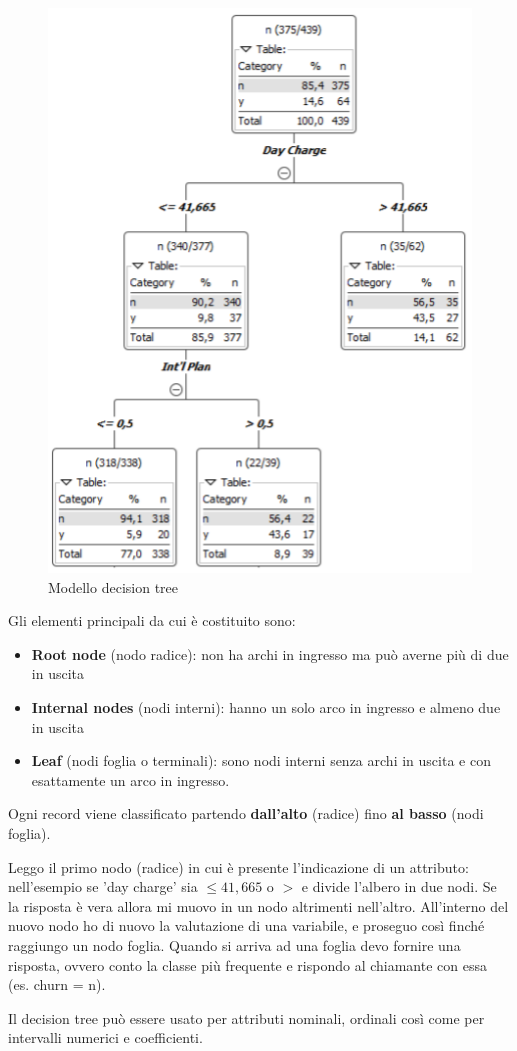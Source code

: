 \begin{figure}[H]
	\centering
	\includegraphics[height=0.7 \linewidth]{classification/pict/decision_tree.png}
	\caption{Modello decision tree}
\end{figure}

Gli elementi principali da cui è costituito sono:
\begin{itemize}
	\item \textbf{Root node} (nodo radice): non ha archi in ingresso ma può averne più di due in uscita
	\item \textbf{Internal nodes} (nodi interni): hanno un solo arco in ingresso e almeno due in uscita
	\item \textbf{Leaf} (nodi foglia o terminali): sono nodi interni senza archi in uscita e con esattamente un arco in ingresso.
\end{itemize}

Ogni record viene classificato partendo \textbf{dall'alto} (radice) fino \textbf{al basso} (nodi foglia).

Leggo il primo nodo (radice) in cui è presente l'indicazione di un attributo: nell'esempio se 'day charge' sia $\le 41,665$ o  $>$ e divide l'albero in due nodi. Se la risposta è vera allora mi muovo in un nodo altrimenti nell'altro. All'interno del nuovo nodo ho di nuovo la valutazione di una variabile, e proseguo così finché raggiungo un nodo foglia.
Quando si arriva ad una foglia devo fornire una risposta, ovvero conto la classe più frequente e rispondo al chiamante con essa (es. churn = n).

Il decision tree può essere usato per attributi nominali, ordinali così come per intervalli numerici e coefficienti.
 
